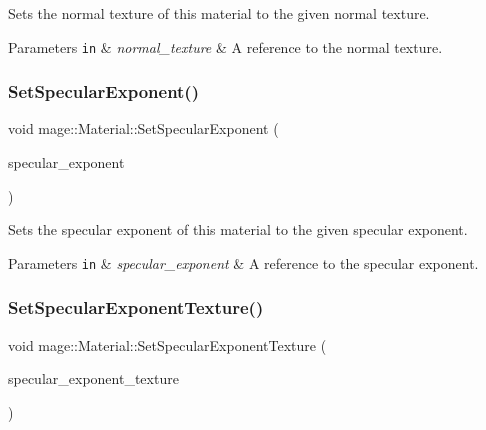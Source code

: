 Sets the normal texture of this material to the given normal texture.


\begin{DoxyParams}[1]{Parameters}
\mbox{\tt in}  & {\em normal\+\_\+texture} & A reference to the normal texture. \\
\hline
\end{DoxyParams}
\hypertarget{structmage_1_1_material_a078a2c9388993523e29f287e20385b3f}{}\label{structmage_1_1_material_a078a2c9388993523e29f287e20385b3f} 
\subsubsection{\texorpdfstring{Set\+Specular\+Exponent()}{SetSpecularExponent()}}
{\footnotesize\ttfamily void mage\+::\+Material\+::\+Set\+Specular\+Exponent (\begin{DoxyParamCaption}\item[{float}]{specular\+\_\+exponent }\end{DoxyParamCaption})\hspace{0.3cm}{\ttfamily [noexcept]}}

Sets the specular exponent of this material to the given specular exponent.


\begin{DoxyParams}[1]{Parameters}
\mbox{\tt in}  & {\em specular\+\_\+exponent} & A reference to the specular exponent. \\
\hline
\end{DoxyParams}
\hypertarget{structmage_1_1_material_ae07cb5f8c3b4ee0d6e6f4f91c1cbbf35}{}\label{structmage_1_1_material_ae07cb5f8c3b4ee0d6e6f4f91c1cbbf35} 
\subsubsection{\texorpdfstring{Set\+Specular\+Exponent\+Texture()}{SetSpecularExponentTexture()}}
{\footnotesize\ttfamily void mage\+::\+Material\+::\+Set\+Specular\+Exponent\+Texture (\begin{DoxyParamCaption}\item[{\hyperlink{namespacemage_a1e01ae66713838a7a67d30e44c67703e}{Shared\+Ptr}$<$ \hyperlink{classmage_1_1_texture}{Texture} $>$}]{specular\+\_\+exponent\+\_\+texture }\end{DoxyParamCaption})}

